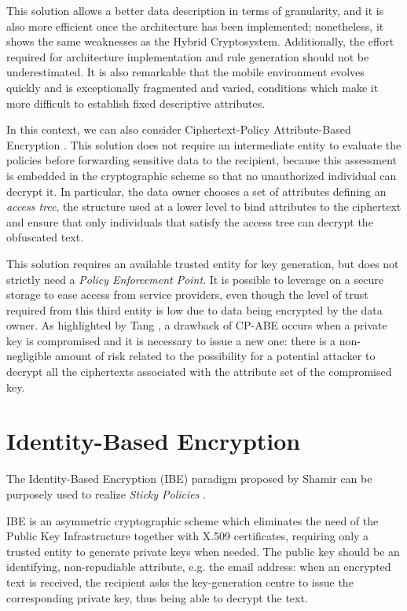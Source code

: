 This solution allows a better data description in terms of granularity, and it is also more efficient once the architecture has been implemented; nonetheless, it shows the same weaknesses as the Hybrid Cryptosystem. Additionally, the effort required for architecture implementation and rule generation should not be underestimated. It is also remarkable that the mobile environment evolves quickly and is exceptionally fragmented and varied, conditions which make it more difficult to establish fixed descriptive attributes.

In this context, we can also consider Ciphertext-Policy Attribute-Based Encryption \cite{bethencourt2007ciphertext}. This solution does not require an intermediate entity to evaluate the policies before forwarding sensitive data to the recipient, because this assessment is embedded in the cryptographic scheme so that no unauthorized individual can decrypt it. In particular, the data owner chooses a set of attributes defining an \textit{access tree}, the structure used at a lower level to bind attributes to the ciphertext and ensure that only individuals that satisfy the access tree can decrypt the obfuscated text.

This solution requires an available trusted entity for key generation, but does not strictly need a \textit{Policy Enforcement Point}. It is possible to leverage on a secure storage to ease access from service providers, even though the level of trust required from this third entity is low due to data being encrypted by the data owner. As highlighted by Tang  \cite{tang2008using}, a drawback of CP-ABE occurs when a private key is compromised and it is necessary to issue a new one: there is a non-negligible amount of risk related to the possibility for a potential attacker to decrypt all the ciphertexts associated with the attribute set of the compromised key.

\section{Identity-Based Encryption}
The Identity-Based Encryption (IBE) paradigm proposed by Shamir \cite{shamir1984identity} can be purposely used to realize \textit{Sticky Policies} \cite{mont2003towards}.

IBE is an asymmetric cryptographic scheme which eliminates the need of the Public Key Infrastructure together with X.509 certificates, requiring only a trusted entity to generate private keys when needed. The public key should be an identifying, non-repudiable attribute, e.g. the email address: when an encrypted text is received, the recipient asks the key-generation centre to issue the corresponding private key, thus being able to decrypt the text.

